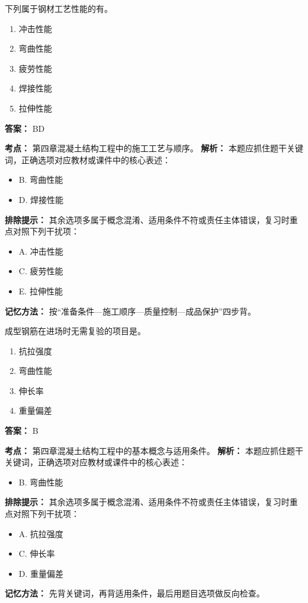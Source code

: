 \documentclass[UTF8,fontset=fandol,11pt]{ctexart}
\begin{document}
\begin{quizbox}[title={第 4 题}]
下列属于钢材工艺性能的有。\\
\begin{enumerate}[label=\Alph*.]
\item 冲击性能
\item 弯曲性能
\item 疲劳性能
\item 焊接性能
\item 拉伸性能
\end{enumerate}
\textbf{答案：} BD
\vspace{0.25em}
\begin{answerbox}[title={考点解析}]
\textbf{考点：} 第四章混凝土结构工程中的施工工艺与顺序。
\textbf{解析：} 本题应抓住题干关键词，正确选项对应教材或课件中的核心表述：
\begin{itemize}
\item B. 弯曲性能
\item D. 焊接性能
\end{itemize}
\textbf{排除提示：} 其余选项多属于概念混淆、适用条件不符或责任主体错误，复习时重点对照下列干扰项：
\begin{itemize}
\item A. 冲击性能
\item C. 疲劳性能
\item E. 拉伸性能
\end{itemize}
\textbf{记忆方法：} 按“准备条件—施工顺序—质量控制—成品保护”四步背。
\end{answerbox}
\end{quizbox}

\begin{quizbox}[title={第 5 题}]
成型钢筋在进场时无需复验的项目是。\\
\begin{enumerate}[label=\Alph*.]
\item 抗拉强度
\item 弯曲性能
\item 伸长率
\item 重量偏差
\end{enumerate}
\textbf{答案：} B
\vspace{0.25em}
\begin{answerbox}[title={考点解析}]
\textbf{考点：} 第四章混凝土结构工程中的基本概念与适用条件。
\textbf{解析：} 本题应抓住题干关键词，正确选项对应教材或课件中的核心表述：
\begin{itemize}
\item B. 弯曲性能
\end{itemize}
\textbf{排除提示：} 其余选项多属于概念混淆、适用条件不符或责任主体错误，复习时重点对照下列干扰项：
\begin{itemize}
\item A. 抗拉强度
\item C. 伸长率
\item D. 重量偏差
\end{itemize}
\textbf{记忆方法：} 先背关键词，再背适用条件，最后用题目选项做反向检查。
\end{answerbox}
\end{quizbox}
\end{document}
